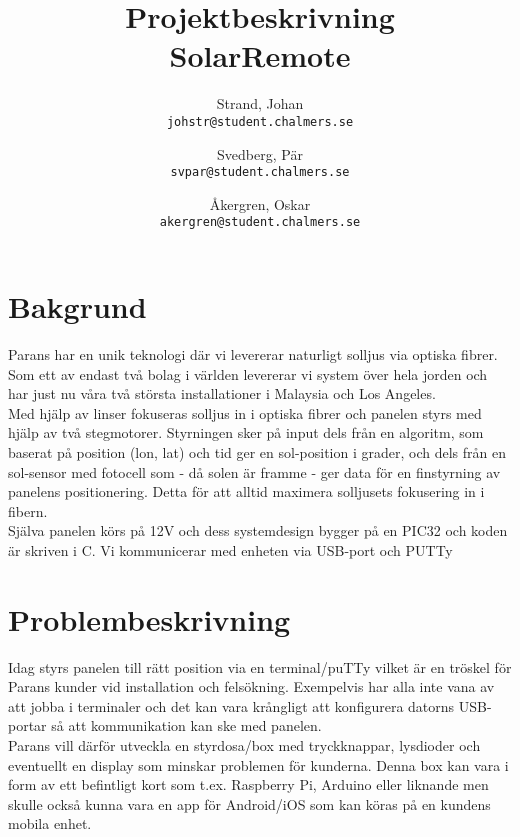\documentclass{article}
\author{	Strand, Johan \\ \texttt{johstr@student.chalmers.se} \and
			Svedberg, Pär\\ \texttt{svpar@student.chalmers.se} \and
			Åkergren, Oskar\\ \texttt{akergren@student.chalmers.se}
}
\title{Projektbeskrivning  \\ SolarRemote}
\begin{document}
	\maketitle\vspace*{-1cm}

		\section*{Bakgrund} %
		\label{sub:bakgrund}

			\noindent Parans har en unik teknologi där vi levererar naturligt solljus via optiska fibrer.
			Som ett av endast två bolag i världen levererar vi system över hela jorden och har just nu våra två största installationer i Malaysia och Los Angeles.\\

			\noindent Med hjälp av linser fokuseras solljus in i optiska fibrer och panelen styrs med hjälp av två stegmotorer. Styrningen sker på input dels från en algoritm, som baserat på position (lon, lat) och tid ger en sol-position i grader, och dels från en sol-sensor med fotocell som - då solen är framme - ger data för en finstyrning av panelens positionering.
			Detta för att alltid maximera solljusets fokusering in i fibern.\\

			\noindent Själva panelen körs på 12V och dess systemdesign bygger på en PIC32 och
			koden är skriven i C. Vi kommunicerar med enheten via USB-port och PUTTy


		\section*{Problembeskrivning} %
		\label{sub:problem}

			\noindent Idag styrs panelen till rätt position via en terminal/puTTy vilket är en tröskel för Parans kunder vid installation och felsökning. 
			Exempelvis har alla inte vana av att jobba i terminaler och det kan vara krångligt att konfigurera datorns USB-portar så att kommunikation kan ske med panelen. \\

			\noindent Parans vill därför utveckla en styrdosa/box med tryckknappar, lysdioder och eventuellt en display som minskar problemen för kunderna.
			Denna box kan vara i form av ett befintligt kort som t.ex. Raspberry Pi, Arduino eller liknande men skulle också kunna vara en app för Android/iOS som kan köras på en kundens mobila enhet.
\end{document}
